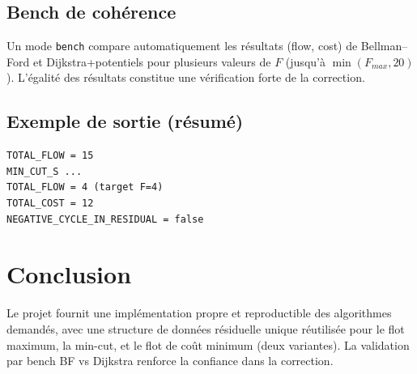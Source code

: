 \documentclass{rapport}
\begin{document}
\subsection{Bench de cohérence}
Un mode \texttt{bench} compare automatiquement les résultats (flow, cost) de Bellman--Ford et Dijkstra+potentiels pour plusieurs valeurs de $F$ (jusqu'à $\min(F_{max},20)$). L'égalité des résultats constitue une vérification forte de la correction.

\subsection{Exemple de sortie (résumé)}
\begin{lstlisting}
TOTAL_FLOW = 15
MIN_CUT_S ...
TOTAL_FLOW = 4 (target F=4)
TOTAL_COST = 12
NEGATIVE_CYCLE_IN_RESIDUAL = false
\end{lstlisting}

\section{Conclusion}
Le projet fournit une implémentation propre et reproductible des algorithmes demandés, avec une structure de données résiduelle unique réutilisée pour le flot maximum, la min-cut, et le flot de coût minimum (deux variantes). La validation par bench BF vs Dijkstra renforce la confiance dans la correction.
\end{document}
